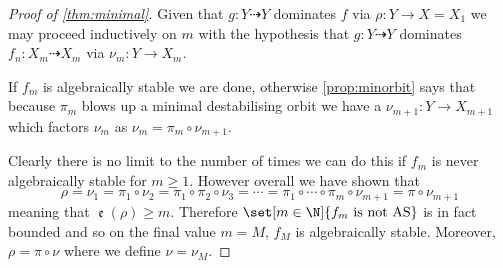 \documentclass[11pt, final]{amsart}
\newcommand{\dashto}{\dashrightarrow}
\newcommand{\sgraph}{\Sigma}
\DeclareMathOperator{\comp}{\mathfrak e}
\begin{document}
\begin{proof}[Proof of \autoref{thm:minimal}]
%
%
Given that $g : Y \dashto Y$ dominates $f$ via $\rho : Y \to X = X_1$ we may proceed inductively on $m$ with the hypothesis that $g : Y \dashto Y$ dominates $f_n : X_m \dashto X_m$ via $\nu_m : Y \to X_m$.

If $f_m$ is algebraically stable we are done, otherwise \autoref{prop:minorbit} says that because $\pi_m$ blows up a minimal destabilising orbit we have a $\nu_{m+1} : Y \to X_{m+1}$ which factors $\nu_m$ as $\nu_m = \pi_m \circ \nu_{m+1}$.
\begin{center}
\end{center}
Clearly there is no limit to the number of times we can do this if $f_m$ is never algebraically stable for $m \ge 1$. However overall we have shown that \[\rho = \nu_1 = \pi_1 \circ \nu_2 = \pi_1 \circ \pi_2 \circ \nu_3 = \cdots = \pi_1 \circ \cdots \circ \pi_m \circ \nu_{m+1} = \pi \circ \nu_{m+1}\] meaning that $\comp(\rho) \ge m$. Therefore $\set[m \in \N]{f_m \text{ is not AS}}$ is in fact bounded and so on the final value $m = M$, $f_M$ is algebraically stable. Moreover, $\rho = \pi \circ \nu$ where we define $\nu = \nu_M$.


\end{proof}
\end{document}
